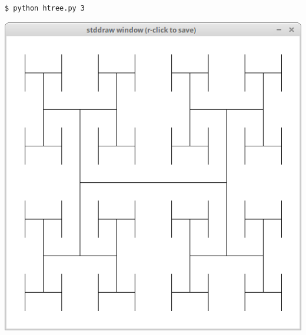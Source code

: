 \documentclass[8pt,a4paper,compress,handout]{beamer}
\begin{document}
\begin{frame}[fragile]
\begin{minipage}{160pt}
\begin{lstlisting}[language={}]
$ python htree.py 3
\end{lstlisting}
\end{minipage}%
\begin{minipage}{140pt}
\hfill \includegraphics[scale=0.15]{figures/htree2.png}
\end{minipage}

\smallskip


\end{frame}
\end{document}
